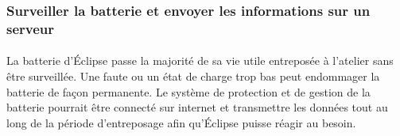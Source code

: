 		\subsubsection{Surveiller la batterie et envoyer les informations sur un serveur}
		
			\paragraph{}
			La batterie d'Éclipse passe la majorité de sa vie utile entreposée à l'atelier sans être surveillée. Une faute ou un état de charge trop bas peut endommager la batterie de façon permanente. Le système de protection et de gestion de la batterie pourrait être connecté sur internet et transmettre les données tout au long de la période d'entreposage afin qu'Éclipse puisse réagir au besoin.  
